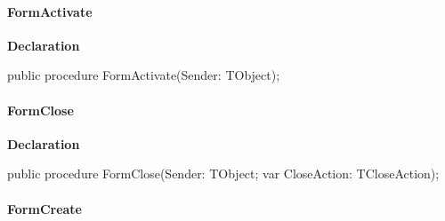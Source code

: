 \documentclass{report}
\newif\ifpdf
\begin{document}
\paragraph*{FormActivate}\hspace*{\fill}

\label{xtypefm.TimdFrm-FormActivate}
\begin{list}{}{
\setlength{\itemindent}{0cm}
\setlength{\listparindent}{0cm}
\setlength{\leftmargin}{\evensidemargin}
\addtolength{\leftmargin}{\tmplength}
\settowidth{\labelsep}{X}
\addtolength{\leftmargin}{\labelsep}
\setlength{\labelwidth}{\tmplength}
}
\item[\textbf{Declaration}\hfill]
\ifpdf
\begin{flushleft}
\fi
\begin{ttfamily}
public procedure FormActivate(Sender: TObject);\end{ttfamily}

\ifpdf
\end{flushleft}
\fi

\end{list}
\paragraph*{FormClose}\hspace*{\fill}

\label{xtypefm.TimdFrm-FormClose}
\begin{list}{}{
\setlength{\itemindent}{0cm}
\setlength{\listparindent}{0cm}
\setlength{\leftmargin}{\evensidemargin}
\addtolength{\leftmargin}{\tmplength}
\settowidth{\labelsep}{X}
\addtolength{\leftmargin}{\labelsep}
\setlength{\labelwidth}{\tmplength}
}
\item[\textbf{Declaration}\hfill]
\ifpdf
\begin{flushleft}
\fi
\begin{ttfamily}
public procedure FormClose(Sender: TObject; var CloseAction: TCloseAction);\end{ttfamily}

\ifpdf
\end{flushleft}
\fi

\end{list}
\paragraph*{FormCreate}\hspace*{\fill}
\end{document}

